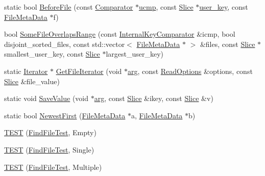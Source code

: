 \begin{DoxyCompactItemize}
\item 
static bool \hyperlink{namespaceleveldb_ad320b62435f131ca2217d00425cae151}{Before\-File} (const \hyperlink{structleveldb_1_1_comparator}{Comparator} $\ast$\hyperlink{version__set_8cc_a598e50ba29b234ea6ee753e383e79452}{ucmp}, const \hyperlink{classleveldb_1_1_slice}{Slice} $\ast$\hyperlink{version__set_8cc_afced2118ae0bf03db7c7e75a21cfd004}{user\-\_\-key}, const \hyperlink{structleveldb_1_1_file_meta_data}{File\-Meta\-Data} $\ast$f)
\item 
bool \hyperlink{namespaceleveldb_a1a6a370f17b20667b885b5b91159c5a9}{Some\-File\-Overlaps\-Range} (const \hyperlink{classleveldb_1_1_internal_key_comparator}{Internal\-Key\-Comparator} \&icmp, bool disjoint\-\_\-sorted\-\_\-files, const std\-::vector$<$ \hyperlink{structleveldb_1_1_file_meta_data}{File\-Meta\-Data} $\ast$ $>$ \&files, const \hyperlink{classleveldb_1_1_slice}{Slice} $\ast$smallest\-\_\-user\-\_\-key, const \hyperlink{classleveldb_1_1_slice}{Slice} $\ast$largest\-\_\-user\-\_\-key)
\item 
static \hyperlink{classleveldb_1_1_iterator}{Iterator} $\ast$ \hyperlink{namespaceleveldb_a90825bb2cdcea64469b179f6d9c5de00}{Get\-File\-Iterator} (void $\ast$\hyperlink{env__posix_8cc_a9ce2ec4812a92cb6ab39f6e81e9173a9}{arg}, const \hyperlink{structleveldb_1_1_read_options}{Read\-Options} \&options, const \hyperlink{classleveldb_1_1_slice}{Slice} \&file\-\_\-value)
\item 
static void \hyperlink{namespaceleveldb_a10c2a57fa55323ee1cb072a74c15bf24}{Save\-Value} (void $\ast$\hyperlink{env__posix_8cc_a9ce2ec4812a92cb6ab39f6e81e9173a9}{arg}, const \hyperlink{classleveldb_1_1_slice}{Slice} \&ikey, const \hyperlink{classleveldb_1_1_slice}{Slice} \&v)
\item 
static bool \hyperlink{namespaceleveldb_ab65191269f2a256a310edf82d56ed842}{Newest\-First} (\hyperlink{structleveldb_1_1_file_meta_data}{File\-Meta\-Data} $\ast$a, \hyperlink{structleveldb_1_1_file_meta_data}{File\-Meta\-Data} $\ast$b)
\item 
\hyperlink{namespaceleveldb_a188b103f7d0b4ade94f516f01a09aa06}{T\-E\-S\-T} (\hyperlink{classleveldb_1_1_find_file_test}{Find\-File\-Test}, Empty)
\item 
\hyperlink{namespaceleveldb_aede67af3ba40cb44c1ff914d7074ba48}{T\-E\-S\-T} (\hyperlink{classleveldb_1_1_find_file_test}{Find\-File\-Test}, Single)
\item 
\hyperlink{namespaceleveldb_a6ae343add2f7159a8d66341f271a99c2}{T\-E\-S\-T} (\hyperlink{classleveldb_1_1_find_file_test}{Find\-File\-Test}, Multiple)

\end{DoxyCompactItemize}

